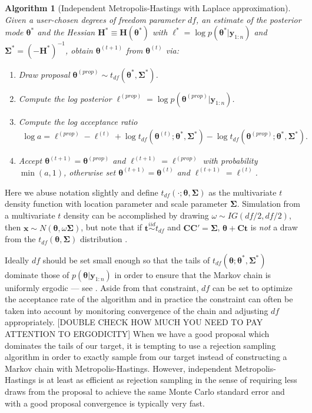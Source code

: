 \documentclass[12pt]{article}
\newtheorem{alg}{Algorithm}
\begin{document}
\begin{alg}[Independent Metropolis-Hastings with Laplace approximation]\label{alg:IM1}
Given a user-chosen degrees of freedom parameter $df$, an estimate of the posterior mode $\bm{\theta}^*$ and the Hessian $\bm{H}^* \equiv \bm{H}(\bm{\theta}^*)$ with $\ell^* = \log p(\bm{\theta}^*|\bm{y}_{1:n})$ and $\bm{\Sigma}^* = (-\bm{H}^*)^{-1}$, obtain $\bm{\theta}^{(t+1)}$ from $\bm{\theta}^{(t)}$ via:
\begin{enumerate}
\item Draw proposal $\bm{\theta}^{(prop)} \sim t_{df}(\bm{\theta}^*, \bm{\Sigma}^*)$.
\item Compute the log posterior $\ell^{(prop)} = \log p(\bm{\theta}^{(prop)}|\bm{y}_{1:n})$.
\item Compute the log acceptance ratio 
\begin{align*}
\log a = \ell^{(prop)} - \ell^{(t)} + \log t_{df}(\bm{\theta}^{(t)}; \bm{\theta}^*, \bm{\Sigma}^*) - \log t_{df}(\bm{\theta}^{(prop)}; \bm{\theta}^*, \bm{\Sigma}^*).
\end{align*}

\item Accept $\bm{\theta}^{(t+1)} = \bm{\theta}^{(prop)}$ and $\ell^{(t+1)} = \ell^{(prop)}$ with probability $\min(a, 1)$, otherwise set $\bm{\theta}^{(t+1)} = \bm{\theta}^{(t)}$ and $\ell^{(t+1)} = \ell^{(t)}$.
\end{enumerate}
\end{alg}
\noindent Here we abuse notation slightly and define $t_{df}(\cdot;\bm{\theta}, \bm{\Sigma})$ as the multivariate $t$ density function with location parameter and scale parameter $\bm{\Sigma}$. Simulation from a multivariate $t$ density can be accomplished by drawing $\omega\sim IG(df/2, df/2)$, then $\bm{x} \sim N(\bm{\theta}, \omega\bm{\Sigma})$, but note that if $\bm{t} \stackrel{iid}{\sim} t_{df}$ and $\bm{C}\bm{C}' = \bm{\Sigma}$, $\bm{\theta} + \bm{C}\bm{t}$ is {\it not} a draw from the $t_{df}(\bm{\theta},\bm{\Sigma})$ distribution \citep{hofert2013sampling}. 

Ideally $df$ should be set small enough so that the tails of $t_{df}(\bm{\theta};\bm{\theta}^*,\bm{\Sigma}^*)$ dominate those of $p(\bm{\theta}|\bm{y}_{1:n})$ in order to ensure that the Markov chain is uniformly ergodic --- see \citet[Theorem~7.8]{robert2013monte}. Aside from that constraint, $df$ can be set to optimize the acceptance rate of the algorithm and in practice the constraint can often be taken into account by monitoring convergence of the chain and adjusting $df$ appropriately. [DOUBLE CHECK HOW MUCH YOU NEED TO PAY ATTENTION TO ERGODICITY] When we have a good proposal which dominates the tails of our target, it is tempting to use a rejection sampling algorithm in order to exactly sample from our target instead of constructing a Markov chain with Metropolis-Hastings. However, independent Metropolis-Hastings is at least as efficient as rejection sampling in the sense of requiring less draws from the proposal to achieve the same Monte Carlo standard error \citep{liu1996metropolized} and with a good proposal convergence is typically very fast.
\end{document}
